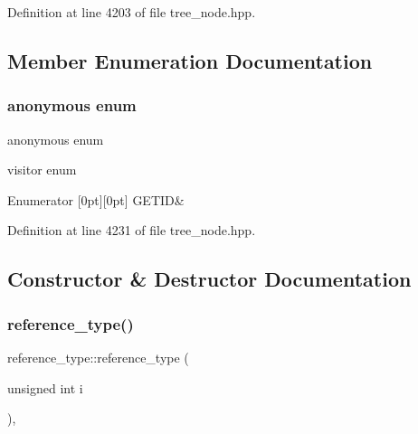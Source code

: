 Definition at line 4203 of file tree\+\_\+node.\+hpp.



\subsection{Member Enumeration Documentation}
\mbox{\label{structreference__type_ad64f38915816d3f28900bc26076a263e}} 
\subsubsection{\texorpdfstring{anonymous enum}{anonymous enum}}
{\footnotesize\ttfamily anonymous enum}



visitor enum 

\begin{DoxyEnumFields}{Enumerator}
[0pt][0pt]{}\mbox{\label{structreference__type_ad64f38915816d3f28900bc26076a263ea1b61513d770869387c9381cbed516040}} 
G\+E\+T\+ID&\\
\hline

\end{DoxyEnumFields}


Definition at line 4231 of file tree\+\_\+node.\+hpp.



\subsection{Constructor \& Destructor Documentation}
\mbox{\label{structreference__type_a896873aa25bf963c03e4b219f05d5b40}} 
\subsubsection{\texorpdfstring{reference\+\_\+type()}{reference\_type()}}
{\footnotesize\ttfamily reference\+\_\+type\+::reference\+\_\+type (\begin{DoxyParamCaption}\item[{unsigned int}]{i }\end{DoxyParamCaption})\hspace{0.3cm}{\ttfamily [inline]}, {\ttfamily [explicit]}}



